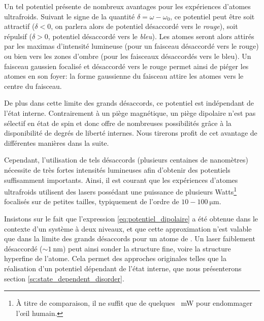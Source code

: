 Un tel potentiel présente de nombreux avantages pour les expériences d'atomes ultrafroids. Suivant le signe de la quantité $\delta = \omega-\omega_0$, ce potentiel peut être soit attractif ($\delta<0$, on parlera alors de potentiel désaccordé vers le \emph{rouge}), soit répulsif ($\delta>0$, potentiel désaccordé vers le \emph{bleu}). Les atomes seront alors attirés par les maximas d'intensité lumineuse (pour un faisceau désaccordé vers le rouge) ou bien vers les zones d'ombre (pour les faisceaux désaccordés vers le bleu). Un faisceau gaussien focalisé et désaccordé vers le rouge permet ainsi de piéger les atomes en son foyer: la forme gaussienne du faisceau attire les atomes vers le centre du faisceau. 

De plus dans cette limite des grands désaccords, ce potentiel est indépendant de l'état interne. Contrairement à un piège magnétique, un piège dipolaire n'est pas sélectif en état de spin et donc offre de nombreuses possibilités grâce à la disponibilité de degrés de liberté internes. Nous tirerons profit de cet avantage de différentes manières dans la suite. 

Cependant, l'utilisation de tels désaccords (plusieurs centaines de nanomètres) nécessite de très fortes intensités lumineuses afin d'obtenir des potentiels suffisamment importants. Ainsi, il est courant que les expériences d'atomes ultrafroids utilisent des lasers possédant une puissance de plusieurs Watts\footnote{À titre de comparaison, il ne suffit que de quelques \SI{}{\milli\watt} pour endommager l'œil humain.} focalisés sur de petites tailles, typiquement de l'ordre de $10-\SI{100}{\micro\metre}$. 

Insistons sur le fait que l'expression \ref{eq:potentiel_dipolaire} a été obtenue dans le contexte d'un système à deux niveaux, et que cette approximation n'est valable que dans la limite des grands désaccords pour un atome de . Un laser faiblement désaccordé ($\sim \SI{1}{\nano\metre}$) peut ainsi sonder la structure fine, voire la structure hyperfine de l'atome. Cela permet des approches originales telles que la réalisation d'un potentiel dépendant de l'état interne, que nous présenterons section \ref{sc:state_dependent_disorder}. %


